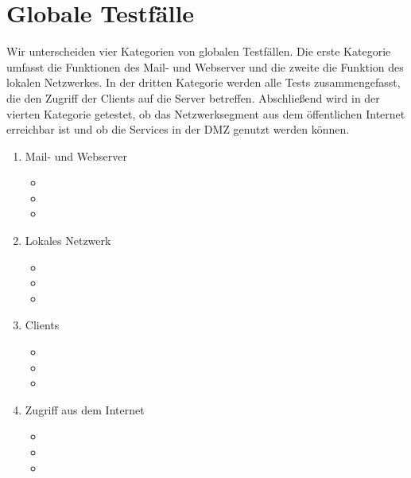 \section{Globale Testfälle}

Wir unterscheiden vier Kategorien von globalen Testfällen. Die erste Kategorie umfasst die Funktionen des Mail- und Webserver und die zweite die Funktion des lokalen Netzwerkes. In der dritten Kategorie werden alle Tests zusammengefasst, die den Zugriff der Clients auf die Server betreffen. Abschließend wird in der vierten Kategorie getestet, ob das Netzwerksegment aus dem öffentlichen Internet erreichbar ist und ob die Services in der DMZ genutzt werden können.

\begin{enumerate}
	\item Mail- und Webserver
		\begin{itemize}
			\item 
			\item 
			\item 
		\end{itemize}
	\item Lokales Netzwerk 
		\begin{itemize}
			\item 
			\item 
			\item 
		\end{itemize}
	\item Clients
		\begin{itemize}
			\item 
			\item 
			\item 
		\end{itemize}
	\item Zugriff aus dem Internet
		\begin{itemize}
			\item 
			\item 
			\item 
		\end{itemize}
\end{enumerate}



